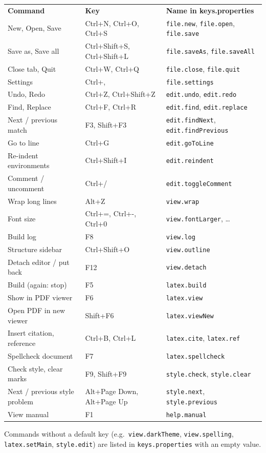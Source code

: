 \documentclass[11pt]{article}
\newcommand{\key}[1]{\textsf{#1}}
\newcommand{\file}[1]{\texttt{#1}}
\begin{document}
    \begin{center}
    \begin{tabular}{lll}
        \textbf{Command} & \textbf{Key} & \textbf{Name in keys.properties}\\[1mm]
        New, Open, Save & \key{Ctrl+N}, \key{Ctrl+O}, \key{Ctrl+S} & \verb+file.new+, \verb+file.open+, \verb+file.save+\\
        Save as, Save all & \key{Ctrl+Shift+S}, \key{Ctrl+Shift+L} & \verb+file.saveAs+, \verb+file.saveAll+\\
        Close tab, Quit & \key{Ctrl+W}, \key{Ctrl+Q} & \verb+file.close+, \verb+file.quit+\\
        Settings & \key{Ctrl+,} & \verb+file.settings+\\
        Undo, Redo & \key{Ctrl+Z}, \key{Ctrl+Shift+Z} & \verb+edit.undo+, \verb+edit.redo+\\
        Find, Replace & \key{Ctrl+F}, \key{Ctrl+R} & \verb+edit.find+, \verb+edit.replace+\\
        Next / previous match & \key{F3}, \key{Shift+F3} & \verb+edit.findNext+, \verb+edit.findPrevious+\\
        Go to line & \key{Ctrl+G} & \verb+edit.goToLine+\\
        Re-indent environments & \key{Ctrl+Shift+I} & \verb+edit.reindent+\\
        Comment / uncomment & \key{Ctrl+/} & \verb+edit.toggleComment+\\
        Wrap long lines & \key{Alt+Z} & \verb+view.wrap+\\
        Font size & \key{Ctrl+=}, \key{Ctrl+-}, \key{Ctrl+0} & \verb+view.fontLarger+, \ldots\\
        Build log & \key{F8} & \verb+view.log+\\
        Structure sidebar & \key{Ctrl+Shift+O} & \verb+view.outline+\\
        Detach editor / put back & \key{F12} & \verb+view.detach+\\
        Build (again: stop) & \key{F5} & \verb+latex.build+\\
        Show in PDF viewer & \key{F6} & \verb+latex.view+\\
        Open PDF in new viewer & \key{Shift+F6} & \verb+latex.viewNew+\\
        Insert citation, reference & \key{Ctrl+B}, \key{Ctrl+L} & \verb+latex.cite+, \verb+latex.ref+\\
        Spellcheck document & \key{F7} & \verb+latex.spellcheck+\\
        Check style, clear marks & \key{F9}, \key{Shift+F9} & \verb+style.check+, \verb+style.clear+\\
        Next / previous style problem & \key{Alt+Page Down}, \key{Alt+Page Up} & \verb+style.next+, \verb+style.previous+\\
        View manual & \key{F1} & \verb+help.manual+
    \end{tabular}
    \end{center}
    Commands without a default key (e.g.\ \verb+view.darkTheme+, \verb+view.spelling+, \verb+latex.setMain+, \verb+style.edit+) are listed in \file{keys.properties} with an empty value.
\end{document}
